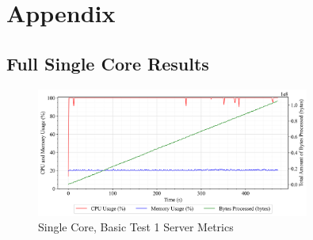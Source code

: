 \chapter{Appendix}
\newcommand\x{0.8} %
\newcommand\xLarge{1.0} %


\newpage
\section{Full Single Core Results}
\begin{figure}[h!t]
    \begin{center}
    \label{Fig:A1.1}
    \caption{Single Core, Basic Test 1 Server Metrics}
    \includegraphics[width=\x\textwidth]{Chapter4/Results/1c_results/arty-a7-1c_basic_1_20241004_110917.db_server_metrics.png}
    \end{center}
\end{figure}

